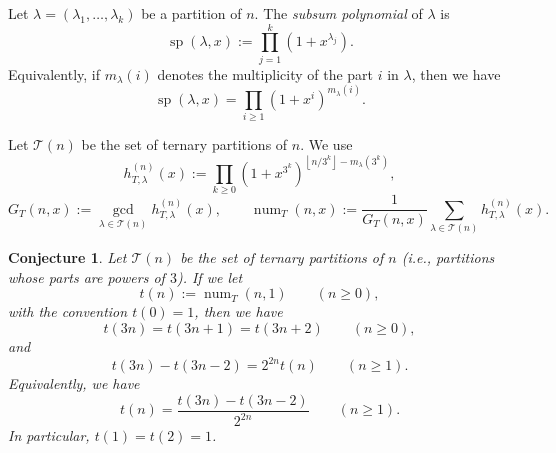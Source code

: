 \documentclass[12pt]{amsart}
\newtheorem{conjecture}{Conjecture}
\DeclareMathOperator{\spol}{sp}
\DeclareMathOperator{\num}{num}
\newcommand{\floor}[1]{\left\lfloor #1\right\rfloor}
\newcommand{\TT}{\mathcal T}
\begin{document}
Let \(\lambda=(\lambda_1,\ldots,\lambda_k)\) be a partition of \(n\).  The
\emph{subsum polynomial} of \(\lambda\) is
\begin{equation}
   \spol(\lambda,x):=\prod_{j=1}^k(1+x^{\lambda_j}).
\end{equation}
Equivalently, if \(m_\lambda(i)\) denotes the multiplicity of the part \(i\) in
\(\lambda\), then we have
\[
   \spol(\lambda,x)=\prod_{i\ge1}(1+x^i)^{m_\lambda(i)}.
\]

Let \(\TT(n)\) be the set of ternary partitions of \(n\).  We use
\[
   h_{T,\lambda}^{(n)}(x)
   :=\prod_{k\ge0}(1+x^{3^k})^{\floor{n/3^k}-m_\lambda(3^k)},
\]
\[
   G_T(n,x):=\gcd_{\lambda\in\TT(n)}h_{T,\lambda}^{(n)}(x),
   \qquad
   \num_T(n,x):=\frac{1}{G_T(n,x)}
      \sum_{\lambda\in\TT(n)}h_{T,\lambda}^{(n)}(x).
\]

\begin{conjecture}\label{conj:conj10}
Let \(\TT(n)\) be the set of ternary partitions of \(n\) (i.e.,
partitions whose parts are powers of \(3\)).  If we let
\[
   t(n):=\num_T(n,1)\qquad(n\ge 0),
\]
with the convention \(t(0)=1\), then we have
\[
   t(3n)=t(3n+1)=t(3n+2)\qquad(n\ge 0),
\]
and
\[
   t(3n)-t(3n-2)=2^{2n}t(n)\qquad(n\ge 1).
\]
Equivalently, we have
\[
   t(n)=\frac{t(3n)-t(3n-2)}{2^{2n}}\qquad(n\ge 1).
\]
In particular, \(t(1)=t(2)=1\).
\end{conjecture}
\end{document}
